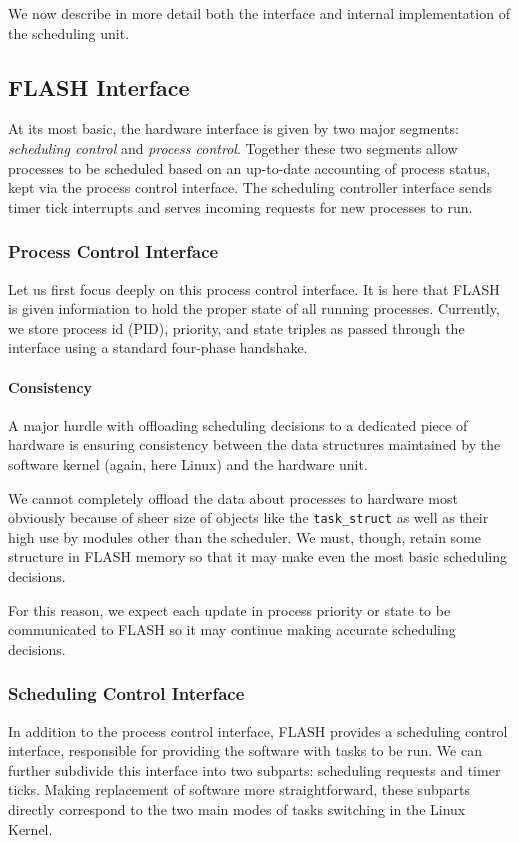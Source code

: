 \documentclass{sig-alternate-10pt}
\newcommand{\ttt}{\texttt}
\begin{document}
We now describe in more detail both the interface and
internal implementation of the scheduling unit.

\subsection{FLASH Interface}
At its most basic, the hardware interface is given by two major segments:
\emph{scheduling control} and \emph{process control}.  Together these two
segments allow processes to be scheduled based on an up-to-date accounting
of process status, kept via the process control interface.  The scheduling
controller interface sends timer tick interrupts and serves incoming
requests for new processes to run.

\subsubsection{Process Control Interface}
Let us first focus deeply on this process control interface.  It is here
that FLASH is given information to hold the proper state of all running
processes.  Currently, we store process id (PID), priority, and state
triples as passed through the interface using a standard four-phase
handshake.

\paragraph{Consistency} A major hurdle with offloading scheduling decisions
to a dedicated piece of hardware is ensuring consistency between the data
structures maintained by the software kernel (again, here Linux) and the
hardware unit.

We cannot completely offload the data about processes to hardware most
obviously because of sheer size of objects like the \ttt{task\_struct} as
well as their high use by modules other than the scheduler.  We must,
though, retain some structure in FLASH memory so that it may make even the
most basic scheduling decisions.

For this reason, we expect each update in process priority or state to be
communicated to FLASH so it may continue making accurate scheduling
decisions.

\subsubsection{Scheduling Control Interface}
In addition to the process control interface, FLASH provides a scheduling
control interface, responsible for providing the software with tasks to be
run.  We can further subdivide this interface into two subparts: scheduling
requests and timer ticks.  Making replacement of software more
straightforward, these subparts directly correspond to the two main modes of
tasks switching in the Linux Kernel.
\end{document}
